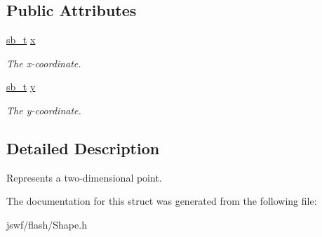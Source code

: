 \subsection*{Public Attributes}
\begin{DoxyCompactItemize}
\item 
\hypertarget{structjswf_1_1flash_1_1_point_a2ca031507c3a432782526bb0f5c6de0b}{\hyperlink{namespacejswf_aa56b2b764590a9e19a5e66693364aceb}{sb\+\_\+t} \hyperlink{structjswf_1_1flash_1_1_point_a2ca031507c3a432782526bb0f5c6de0b}{x}}\label{structjswf_1_1flash_1_1_point_a2ca031507c3a432782526bb0f5c6de0b}

\begin{DoxyCompactList}\small\item\em The x-\/coordinate. \end{DoxyCompactList}\item 
\hypertarget{structjswf_1_1flash_1_1_point_a1d3de737e9aa924b1912070c0442f7fc}{\hyperlink{namespacejswf_aa56b2b764590a9e19a5e66693364aceb}{sb\+\_\+t} \hyperlink{structjswf_1_1flash_1_1_point_a1d3de737e9aa924b1912070c0442f7fc}{y}}\label{structjswf_1_1flash_1_1_point_a1d3de737e9aa924b1912070c0442f7fc}

\begin{DoxyCompactList}\small\item\em The y-\/coordinate. \end{DoxyCompactList}\end{DoxyCompactItemize}


\subsection{Detailed Description}
Represents a two-\/dimensional point. 

The documentation for this struct was generated from the following file\+:\begin{DoxyCompactItemize}
\item 
jswf/flash/Shape.\+h\end{DoxyCompactItemize}
